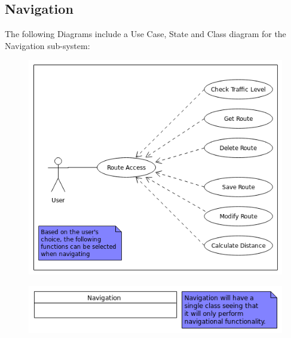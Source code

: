 \documentclass{article}
\begin{document}
	\subsection{Navigation}
	The following Diagrams include a Use Case, State and Class diagram for the Navigation sub-system:
	\begin{figure}[h]
  		\includegraphics[width=\textwidth]{Images/NavigationUseCase.png}
	\end{figure}
	\begin{figure}[h]
  		\includegraphics[width=\textwidth]{Images/NavigationClass.png}
	\end{figure}
\end{document}
